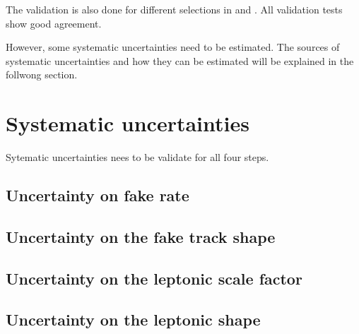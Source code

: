 



The validation is also done for different selections in \pt and \ias.
All validation tests show good agreement.

However, some systematic uncertainties need to be estimated.
The sources of systematic uncertainties and how they can be estimated will be explained in the follwong section.


\section{Systematic uncertainties}
\label{sec:SysUncertaintiesBkg}

Sytematic uncertainties nees to be validate for all four steps.
\subsection{Uncertainty on fake rate}
\label{sec:FakeRateUncertainty}
\subsection{Uncertainty on the fake track \ias shape}
\label{sec:FakeIasUncertainty}
\subsection{Uncertainty on the leptonic scale factor}
\label{sec:LeptonScaleUncertainty}
\subsection{Uncertainty on the leptonic \ias shape}
\label{sec:LeptonIasUncertainty}

